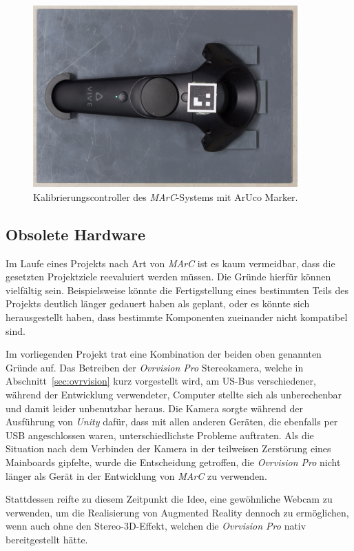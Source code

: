 	\begin{figure}[H]
		\centering
		\includegraphics[width=4in]{Bilder/Eigene Fotos/IMG_0032.jpg}
		\caption[Kalibrierungscontroller des \textit{MArC}-Systems]{Kalibrierungscontroller des \textit{MArC}-Systems mit ArUco Marker.}
		\label{fig:KontrollerMarc}
	\end{figure}
	
\subsection{Obsolete Hardware}\label{sec:obsoleteHardware}%
Im Laufe eines Projekts nach Art von \emph{MArC} ist es kaum vermeidbar, dass die gesetzten Projektziele reevaluiert werden müssen. Die Gründe hierfür können vielfältig sein. Beispielsweise könnte die Fertigstellung eines bestimmten Teils des Projekts deutlich länger gedauert haben als geplant, oder es könnte sich herausgestellt haben, dass bestimmte Komponenten zueinander nicht kompatibel sind.

Im vorliegenden Projekt trat eine Kombination der beiden oben genannten Gründe auf. Das Betreiben der \emph{Ovrvision Pro} Stereokamera, welche in Abschnitt~\ref{sec:ovrvision} kurz vorgestellt wird, am US-Bus verschiedener, während der Entwicklung verwendeter, Computer stellte sich als unberechenbar und damit leider unbenutzbar heraus. Die Kamera sorgte während der Ausführung von \textit{Unity} dafür, dass mit allen anderen Geräten, die ebenfalls per USB angeschlossen waren, unterschiedlichste Probleme auftraten. Als die Situation nach dem Verbinden der Kamera in der teilweisen Zerstörung eines Mainboards gipfelte, wurde die Entscheidung getroffen, die \emph{Ovrvision Pro} nicht länger als Gerät in der Entwicklung von \emph{MArC} zu verwenden.

Stattdessen reifte zu diesem Zeitpunkt die Idee, eine gewöhnliche Webcam zu verwenden, um die Realisierung von Augmented Reality dennoch zu ermöglichen, wenn auch ohne den Stereo-3D-Effekt, welchen die \emph{Ovrvision Pro} nativ bereitgestellt hätte.

